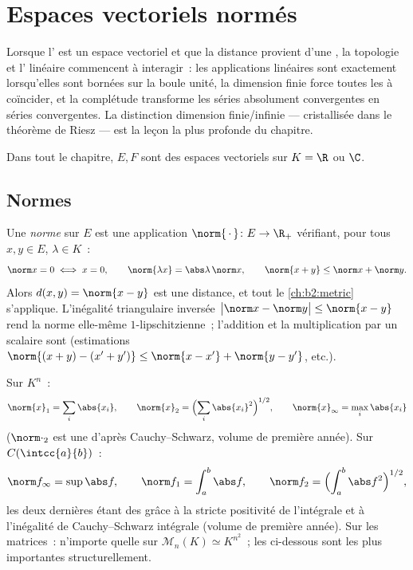 \chapter{Espaces vectoriels normés}\label{ch:b2:nvs}

Lorsque l' est un espace vectoriel et que la distance
provient d'une , la topologie et l' linéaire commencent à
interagir~: les applications linéaires sont  exactement
lorsqu'elles sont bornées sur la boule unité, la dimension finie force
toutes les  à coïncider, et la complétude transforme les séries
absolument convergentes en séries convergentes. La distinction
dimension finie/infinie --- cristallisée dans le théorème de Riesz ---
est la leçon la plus profonde du chapitre.

Dans tout le chapitre, $E, F$ sont des espaces vectoriels sur $K = \R$
ou $\C$.

\section{Normes}

\begin{definition}\label{def:b2:nvs:norm}
Une \emph{norme} sur $E$ est une application $\norm{\,\cdot\,} \colon E
\to \R_+$ vérifiant, pour tous $x, y \in E$, $\lambda \in K$~:
\[
\norm x = 0 \iff x = 0,
\qquad
\norm{\lambda x} = \abs\lambda\,\norm x,
\qquad
\norm{x + y} \leq \norm x + \norm y .
\]
Alors $d(x, y) = \norm{x - y}$ est une distance, et tout le
\cref{ch:b2:metric} s'applique. L'inégalité triangulaire inversée
$\bigl|\norm x - \norm y\bigr| \leq \norm{x - y}$ rend la norme
elle-même $1$-lipschitzienne~; l'addition et la multiplication par un
scalaire sont  (estimations $\norm{(x + y) - (x' + y')} \leq
\norm{x - x'} + \norm{y - y'}$, etc.).
\end{definition}

\begin{example}\label{ex:b2:nvs:examples}
Sur $K^n$~:
\[
\norm{x}_1 = \sum_i \abs{x_i},
\qquad
\norm{x}_2 = \Bigl(\sum_i \abs{x_i}^2\Bigr)^{1/2},
\qquad
\norm{x}_\infty = \max_i \abs{x_i}
\]
($\norm\cdot_2$ est une  d'après Cauchy--Schwarz, volume de
première année). Sur $C(\intcc{a}{b})$~:
\[
\norm f_\infty = \sup \abs f,
\qquad
\norm f_1 = \int_a^b \abs f,
\qquad
\norm f_2 = \Bigl(\int_a^b \abs f^2\Bigr)^{1/2},
\]
les deux dernières étant des  grâce à la stricte positivité de
l'intégrale et à l'inégalité de Cauchy--Schwarz intégrale (volume de
première année). Sur les matrices~: n'importe quelle  sur
$\mathcal M_n(K) \simeq K^{n^2}$~; les  ci-dessous
sont les plus importantes structurellement.
\end{example}

